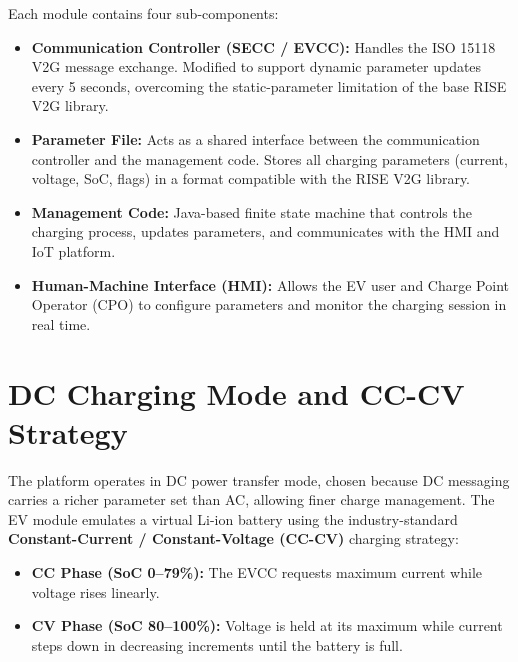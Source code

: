 \documentclass[12pt,a4paper]{report}
\begin{document}
Each module contains four sub-components:

\begin{itemize}
  \item \textbf{Communication Controller (SECC / EVCC):} Handles the ISO 15118 V2G message
        exchange. Modified to support dynamic parameter updates every 5 seconds, overcoming
        the static-parameter limitation of the base RISE V2G library.

  \item \textbf{Parameter File:} Acts as a shared interface between the communication
        controller and the management code. Stores all charging parameters (current, voltage,
        SoC, flags) in a format compatible with the RISE V2G library.

  \item \textbf{Management Code:} Java-based finite state machine that controls the charging
        process, updates parameters, and communicates with the HMI and IoT platform.

  \item \textbf{Human-Machine Interface (HMI):} Allows the EV user and Charge Point Operator
        (CPO) to configure parameters and monitor the charging session in real time.
\end{itemize}

\section{DC Charging Mode and CC-CV Strategy}

The platform operates in DC power transfer mode, chosen because DC messaging carries a richer
parameter set than AC, allowing finer charge management. The EV module emulates a virtual
Li-ion battery using the industry-standard \textbf{Constant-Current / Constant-Voltage (CC-CV)}
charging strategy:

\begin{itemize}
  \item \textbf{CC Phase (SoC 0--79\%):} The EVCC requests maximum current while voltage rises
        linearly.

  \item \textbf{CV Phase (SoC 80--100\%):} Voltage is held at its maximum while current steps
        down in decreasing increments until the battery is full.
\end{itemize}

\end{document}

